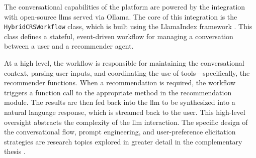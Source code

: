The conversational capabilities of the platform are powered by the integration with open-source \acp{llm} served via Ollama. The core of this integration is the \texttt{HybridCRSWorkflow} class, which is built using the LlamaIndex framework \cite{LLAMAINDEX}. This class defines a stateful, event-driven workflow for managing a conversation between a user and a recommender agent.

At a high level, the workflow is responsible for maintaining the conversational context, parsing user inputs, and coordinating the use of tools---specifically, the recommender functions. When a recommendation is required, the workflow triggers a function call to the appropriate method in the recommendation module. The results are then fed back into the \ac{llm} to be synthesized into a natural language response, which is streamed back to the user. This high-level oversight abstracts the complexity of the \ac{llm} interaction. The specific design of the conversational flow, prompt engineering, and user-preference elicitation strategies are research topics explored in greater detail in the complementary thesis \cite{MUI2ICSI_THESIS}.